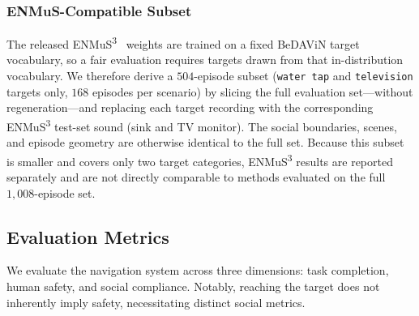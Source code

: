 \subsubsection{ENMuS-Compatible Subset}
The released ENMuS\textsuperscript{3}~\cite{AudiovisualNavigationNoisy2025} weights are trained on a fixed BeDAViN target vocabulary, so a fair evaluation requires targets drawn from that in-distribution vocabulary. We therefore derive a $504$-episode subset (\texttt{water tap} and \texttt{television} targets only, $168$ episodes per scenario) by slicing the full evaluation set---without regeneration---and replacing each target recording with the corresponding ENMuS\textsuperscript{3} test-set sound (sink and TV monitor). The social boundaries, scenes, and episode geometry are otherwise identical to the full set. Because this subset is smaller and covers only two target categories, ENMuS\textsuperscript{3} results are reported separately and are not directly comparable to methods evaluated on the full $1{,}008$-episode set.


\subsection{Evaluation Metrics}
\label{subsec:dataset-metrics}

We evaluate the navigation system across three dimensions: task completion, human safety, and social compliance. Notably, reaching the target does not inherently imply safety, necessitating distinct social metrics.

